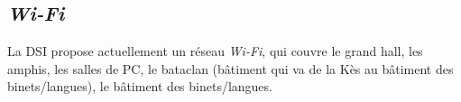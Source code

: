 \subsection{\emph{Wi-Fi}}
La DSI propose actuellement un réseau \emph{Wi-Fi}, qui couvre le grand hall, les amphis, les salles de PC,
le bataclan (bâtiment qui va de la Kès au bâtiment des binets/langues), le bâtiment des binets/langues.


%
%

